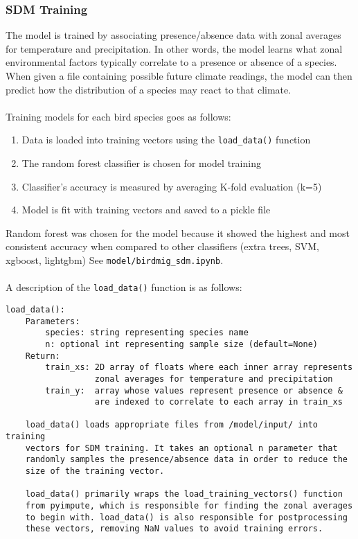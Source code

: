 \documentclass{article}
\begin{document}
\subsubsection{SDM Training}
The model is trained by associating presence/absence data with zonal averages for temperature and precipitation. In other words, the model learns what zonal environmental factors typically correlate to a presence or absence of a species. When given a file containing possible future climate readings, the model can then predict how the distribution of a species may react to that climate.
\\\\
Training models for each bird species goes as follows:
\begin{enumerate}
	\item Data is loaded into training vectors using the \texttt{load\_data()} function
	\item The random forest classifier is chosen for model training
	\item Classifier's accuracy is measured by averaging K-fold evaluation (k=5)
	\item Model is fit with training vectors and saved to a pickle file
\end{enumerate}

\noindent Random forest was chosen for the model because it showed the highest and most consistent accuracy when compared to other classifiers (extra trees, SVM, xgboost, lightgbm) See \texttt{model/birdmig\_sdm.ipynb}.
\\\\
A description of the \texttt{load\_data()} function is as follows:
\begin{Verbatim}[tabsize=4]
load_data():
	Parameters:
		species: string representing species name
		n: optional int representing sample size (default=None)
	Return:
		train_xs: 2D array of floats where each inner array represents 
				  zonal averages for temperature and precipitation 
		train_y:  array whose values represent presence or absence & 
				  are indexed to correlate to each array in train_xs
				  
	load_data() loads appropriate files from /model/input/ into training 
	vectors for SDM training. It takes an optional n parameter that
	randomly samples the presence/absence data in order to reduce the
	size of the training vector.
	
	load_data() primarily wraps the load_training_vectors() function 
	from pyimpute, which is responsible for finding the zonal averages
	to begin with. load_data() is also responsible for postprocessing 
	these vectors, removing NaN values to avoid training errors.
\end{Verbatim}
\end{document}
